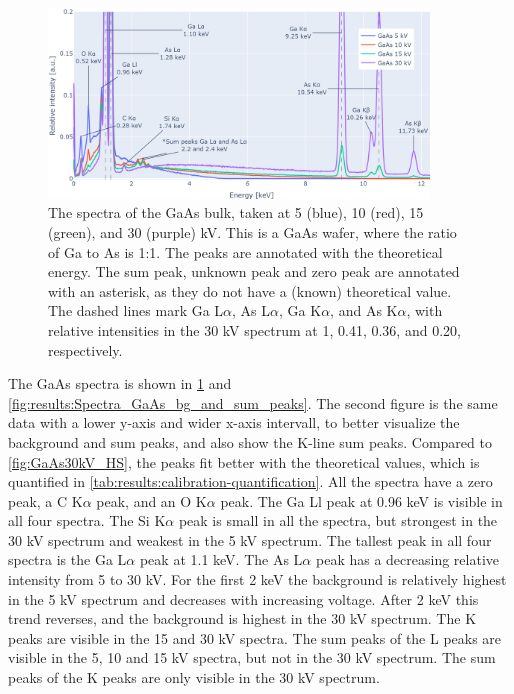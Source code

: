 \begin{figure}[b!] %
    \centering
    \includegraphics[width=0.90\textwidth]{figures/each_spectra/GaAs_everything.png}
    \caption{
        The spectra of the GaAs bulk, taken at 5 (blue), 10 (red), 15 (green), and 30 (purple) kV.
        This is a GaAs wafer, where the ratio of Ga to As is 1:1.
        The peaks are annotated with the theoretical energy.
        The sum peak, unknown peak and zero peak are annotated with an asterisk, as they do not have a (known) theoretical value.
        The dashed lines mark Ga L$\alpha$, As L$\alpha$, Ga K$\alpha$, and As K$\alpha$, with relative intensities in the 30 kV spectrum at 1, 0.41, 0.36, and 0.20, respectively.
    }
    \label{fig:results:Spectra_GaAs}
\end{figure}

The GaAs spectra is shown in \cref{fig:results:Spectra_GaAs} and \cref{fig:results:Spectra_GaAs_bg_and_sum_peaks}.
The second figure is the same data with a lower y-axis and wider x-axis intervall, to better visualize the background and sum peaks, and also show the K-line sum peaks.
Compared to \cref{fig:GaAs30kV_HS}, the peaks fit better with the theoretical values, which is quantified in \cref{tab:results:calibration-quantification}. %
All the spectra have a zero peak, a C K$\alpha$ peak, and an O K$\alpha$ peak.
The Ga Ll peak at 0.96 keV is visible in all four spectra.
The Si K$\alpha$ peak is small in all the spectra, but strongest in the 30 kV spectrum and weakest in the 5 kV spectrum.
The tallest peak in all four spectra is the Ga L$\alpha$ peak at 1.1 keV.
The As L$\alpha$ peak has a decreasing relative intensity from 5 to 30 kV.
For the first 2 keV the background is relatively highest in the 5 kV spectrum and decreases with increasing voltage.
After 2 keV this trend reverses, and the background is highest in the 30 kV spectrum. %
The K peaks are visible in the 15 and 30 kV spectra.
The sum peaks of the L peaks are visible in the 5, 10 and 15 kV spectra, but not in the 30 kV spectrum.
The sum peaks of the K peaks are only visible in the 30 kV spectrum. %






